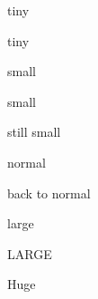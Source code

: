 \documentclass[a4paper]{article}
\begin{document}
        \tiny

				tiny

				tiny

        \small

				small

				small

				still small

        \normalsize

				normal

				back to normal

        \large

				large

        \LARGE

				LARGE

        \Huge

				Huge
\end{document}
